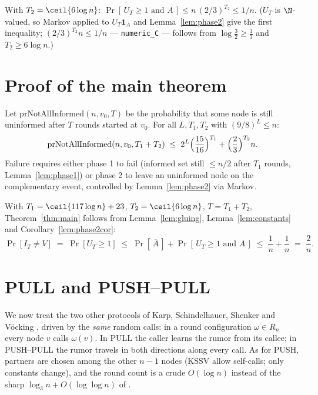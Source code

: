 \begin{corollary}\label{lem:phase2cor}
  \leanok
  With $T_2 = \ceil{6 \log n}$: $\Pr[\, U_T \ge 1 \text{ and } A \,]
    \le n\,(2/3)^{T_2} \le 1/n$. ($U_T$ is $\N$-valued, so Markov applied to
  $U_T \mathbf{1}_A$ and Lemma~\ref{lem:phase2} give the first inequality;
  $(2/3)^{T_2} n \le 1/n$ — \texttt{numeric\_C} — follows from
  $\log\tfrac32 \ge \tfrac13$ and $T_2 \ge 6\log n$.)
\end{corollary}

\section{Proof of the main theorem}\label{sec:proof-main}

\begin{lemma}\label{lem:gluing}
  \leanok
  Let $\mathrm{prNotAllInformed}(n,v_0,T)$ be the probability that some node
  is still uninformed after $T$ rounds started at $v_0$. For all
  $L, T_1, T_2$ with $(9/8)^L \le n$:
  \[
    \mathrm{prNotAllInformed}(n,v_0,T_1+T_2) \;\le\;
      2^{L}\Bigl(\frac{15}{16}\Bigr)^{T_1} + \Bigl(\frac23\Bigr)^{T_2} n.
  \]
  Failure requires either phase 1 to fail (informed set still $\le n/2$
  after $T_1$ rounds, Lemma~\ref{lem:phase1}) or phase 2 to leave an
  uninformed node on the complementary event, controlled by
  Lemma~\ref{lem:phase2} via Markov.
\end{lemma}

With $T_1 = \ceil{117\log n} + 23$, $T_2 = \ceil{6\log n}$, $T = T_1+T_2$,
Theorem~\ref{thm:main} follows from Lemma~\ref{lem:gluing},
Lemma~\ref{lem:constants} and Corollary~\ref{lem:phase2cor}:
\[
  \Pr[I_T \ne V] \;=\; \Pr[U_T \ge 1]
  \;\le\; \Pr[\,\overline{A}\,] + \Pr[\,U_T \ge 1 \text{ and } A\,]
  \;\le\; \frac1n + \frac1n \;=\; \frac2n .
\]

\section{PULL and PUSH--PULL}\label{sec:pull}

We now treat the two other protocols of Karp, Schindelhauer, Shenker and
V\"ocking \cite{KSSV00}, driven by the \emph{same} random calls: in a round
configuration $\omega \in R_n$ every node $v$ calls $\omega(v)$. In PULL the
caller learns the rumor from its callee; in PUSH--PULL the rumor travels in
both directions along every call. As for PUSH, partners are chosen among the
other $n-1$ nodes (KSSV allow self-calls; only constants change), and the
round count is a crude $O(\log n)$ instead of the sharp
$\log_3 n + O(\log\log n)$ of \cite[Thm.~2.1]{KSSV00}.

